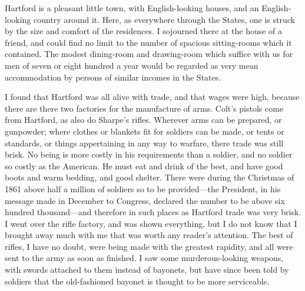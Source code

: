 Hartford is a pleasant little town, with English-looking houses,
and an English-looking country around it.  Here, as everywhere
through the States, one is struck by the size and comfort of the
residences.  I sojourned there at the house of a friend, and could
find no limit to the number of spacious sitting-rooms which it
contained.  The modest dining-room and drawing-room which suffice
with us for men of seven or eight hundred a year would be regarded
as very mean accommodation by persons of similar incomes in the
States.

I found that Hartford was all alive with trade, and that wages were
high, because there are there two factories for the manufacture of
arms.  Colt's pistols come from Hartford, as also do Sharpe's
rifles.  Wherever arms can be prepared, or gunpowder; where clothes
or blankets fit for soldiers can be made, or tents or standards, or
things appertaining in any way to warfare, there trade was still
brisk.  No being is more costly in his requirements than a soldier,
and no soldier so costly as the American.  He must eat and drink of
the best, and have good boots and warm bedding, and good shelter.
There were during the Christmas of 1861 above half a million of
soldiers so to be provided---the President, in his message made in
December to Congress, declared the number to be above six hundred
thousand---and therefore in such places as Hartford trade was very
brisk.  I went over the rifle factory, and was shown everything,
but I do not know that I brought away much with me that was worth
any reader's attention.  The best of rifles, I have no doubt, were
being made with the greatest rapidity, and all were sent to the
army as soon as finished.  I saw some murderous-looking weapons,
with swords attached to them instead of bayonets, but have since
been told by soldiers that the old-fashioned bayonet is thought to
be more serviceable.

